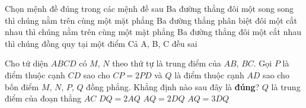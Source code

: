 \begin{ex}%
Chọn mệnh đề đúng trong các mệnh đề sau 
\choice
{Ba đường thẳng đôi một song song thì chúng nằm trên cùng một mặt phẳng}
{Ba đường thẳng phân biệt đôi một cắt nhau thì chúng nằm trên cùng một mặt phẳng}
{Ba đường thẳng đôi một cắt nhau thì chúng đồng quy tại một điểm}
{\True Cả A, B, C đều sai}
\end{ex}

\begin{ex}%
Cho tứ diện $ABCD$ có $M$, $N$ theo thứ tự là trung điểm của $AB$, $BC$. Gọi $P$ là điểm thuộc cạnh $CD$ sao cho $CP=2PD$ và $Q$ là điểm thuộc cạnh $AD$ sao cho bốn điểm $M$, $N$, $P$, $Q$ đồng phẳng. Khẳng định nào sau đây là \textbf{đúng}?
\choice
{$Q$ là trung điểm của đoạn thẳng $AC$}
{$DQ=2AQ$}
{\True $AQ=2DQ$}
{$AQ=3DQ$}
\end{ex}

